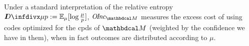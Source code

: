 \documentclass[twoside]{article}
\begin{document}
Under a standard interpretation of the relative entropy $\kldiv{\mu}{p} := \Ex_{\mu}[\log \frac\mu p]$,
$\OInc_{\dg M}$ measures the excess cost of using codes optimized for the cpds of $\dg M$ (weighted by the confidence we have in them), when in fact outcomes are distributed according to $\mu$.
\end{document}
